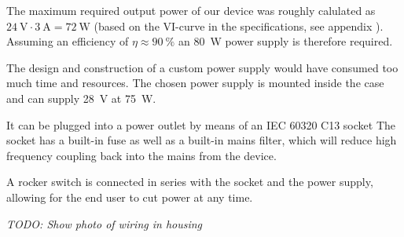 The  maximum required  output power  of our  device was  roughly calulated  as
$\SI{24}{\volt} \cdot \SI{3}{\ampere} = \SI{72}{\watt}$ (based on the VI-curve
in the specifications,  see appendix ).  Assuming  an efficiency of
$\eta\approx  \SI{90}{\percent}$  an  \SI{80}{W}  power  supply  is  therefore
required.


The design and  construction of a custom power supply  would have consumed too
much time  and resources. The chosen power  supply is mounted inside  the case
and can supply \SI{28}{\volt} at \SI{75}{\watt}.

%

It can be plugged  into a power outlet by means of an  IEC 60320 C13 socket
The socket has a built-in fuse as  well as a built-in mains filter, which will
reduce high frequency coupling back into the mains from the device.

A rocker switch
is connected in series with the socket  and the power supply, allowing for the
end user to cut power at any time.

\emph{TODO: Show photo of wiring in housing}

